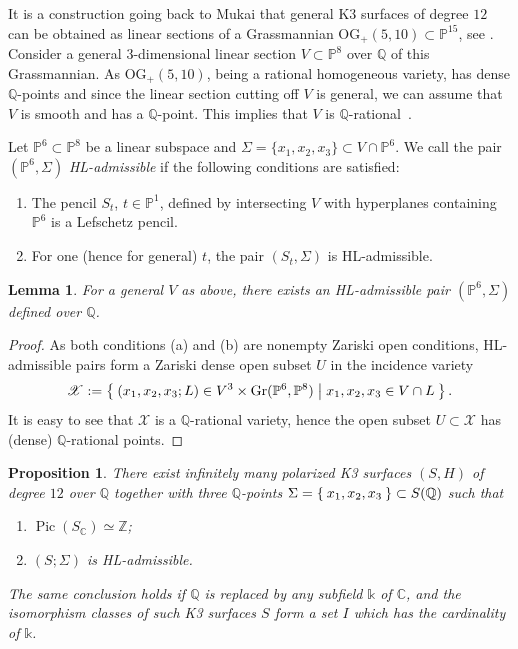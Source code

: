 \documentclass[a4paper,12pt]{amsart}
\def\C{\mathbb C}
\def\k{\mathbb k}
\def\P{\mathbb P}
\def\Q{\mathbb Q}
\def\Z{\mathbb Z}
\def\Pic{{\operatorname{Pic}}}
\def\Gr{{\operatorname{Gr}}}
\def\OG{{\mathrm{OG}}}
\theoremstyle{plain}
\newtheorem{proposition}[dummy]{Proposition}
\newtheorem{lemma}[dummy]{Lemma}
\numberwithin{equation}{section}
\theoremstyle{definition}
\newcommand{\cX}{\mathcal{X}}
\newcommand{\gS}{\Sigma}
\newcommand{\cnec}{\mathrel{:=}}
\renewcommand{\(}{\left(}
\renewcommand{\)}{\right)}
\begin{document}
It is a construction going back to Mukai
that 
general 
K3 surfaces of degree $12$ can be obtained
as linear sections 
of a Grassmannian
$\OG_+(5,10) \subset \P^{15}$, see \cite[2.1]{HassettLai}.
Consider a general $3$-dimensional
linear section $V \subset \P^8$ over $\Q$
of this Grassmannian.
As $\OG_+(5,10)$, being a rational homogeneous variety, 
has dense $\Q$-points and since the linear section cutting off $V$ is general,
we can assume that $V$ is smooth and has a $\Q$-point. 
This implies that $V$ is $\Q$-rational~\cite[Theorem 1.1]{KuPrRatFano3}. 

Let $\P^6 \subset \P^8$ be a linear subspace
and
$\Sigma = \{ x_1, x_2, x_3 \} \subset V \cap \P^6$.
We call the 
pair 
$(\P^6, \gS)$ \emph{HL-admissible}
if the following conditions are satisfied:
\begin{enumerate}
    \item[(a)] The pencil $S_t$, $t \in \P^1$, 
    defined by intersecting
    $V$ with hyperplanes containing $\P^6$ is a Lefschetz pencil.
    \item[(b)] For one (hence for general) $t$, the pair
    $(S_t, \Sigma)$ is HL-admissible.
\end{enumerate}

\begin{lemma}\label{lem:HL-admis-pencil}
For a general $V$ as above, 
there exists an HL-admissible pair $(\P^6, \Sigma)$
defined over $\Q$.
\end{lemma}
\begin{proof} 
As both conditions (a) and (b) are nonempty Zariski open conditions,
HL-admissible pairs form a Zariski dense 
open subset $U$
in the incidence
variety 
$$\cX \cnec \Set{(x_1,x_2,x_3; L) \in V^3 \times \Gr(\P^6,\P^8)
| x_1,x_2,x_3 \in V \cap  L}.$$
It is easy to see that $\cX$ is a $\Q$-rational variety,
hence the open subset $U \subset \cX$ has (dense)
$\Q$-rational points.
\end{proof}

\begin{proposition}\label{pro-K3HLPic1}
There exist infinitely many polarized K3 surfaces $(S,H)$ of degree $12$ over $\Q$
together with three $\Q$-points $\gS = \Set{x_1,x_2,x_3} \subset S(\Q)$
such that
\begin{enumerate}
    \item $\Pic(S_\C) \simeq \Z $;
\item $(S; \gS)$ is HL-admissible. 
\end{enumerate}
The same conclusion holds if $\Q$ is replaced by any subfield $\k$ of $\C$,
and the isomorphism classes of such K3 surfaces $S$
form a set $I$ which has the cardinality of $\k$.
\end{proposition}
\end{document}
